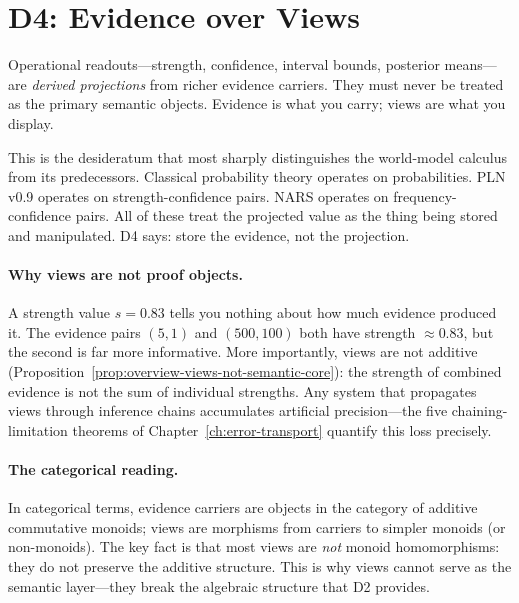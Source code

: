 \documentclass[11pt,openany]{report}
\begin{document}
\section{D4: Evidence over Views}
\label{sec:d4}

\begin{definition}
\label{def:d4}
Operational readouts---strength, confidence, interval bounds, posterior
means---are \emph{derived projections} from richer evidence carriers.
They must never be treated as the primary semantic objects.  Evidence
is what you carry; views are what you display.
\end{definition}

\noindent
This is the desideratum that most sharply distinguishes the world-model
calculus from its predecessors.  Classical probability theory operates
on probabilities.  PLN v0.9 operates on strength-confidence pairs.
NARS operates on frequency-confidence pairs.  All of these treat the
projected value as the thing being stored and manipulated.  D4 says:
store the evidence, not the projection.

\paragraph{Why views are not proof objects.}
A strength value $s = 0.83$ tells you nothing about how much evidence
produced it.  The evidence pairs $(5, 1)$ and $(500, 100)$ both have
strength $\approx 0.83$, but the second is far more informative.
More importantly, views are not additive
(Proposition~\ref{prop:overview-views-not-semantic-core}): the
strength of combined evidence is not the sum of individual strengths.
Any system that propagates views through inference chains accumulates
artificial precision---the five chaining-limitation theorems of
Chapter~\ref{ch:error-transport} quantify this loss precisely.

\paragraph{The categorical reading.}
In categorical terms, evidence carriers are objects in the category
of additive commutative monoids; views are morphisms from carriers to
simpler monoids (or non-monoids).  The key fact is that most views
are \emph{not} monoid homomorphisms: they do not preserve the
additive structure.  This is why views cannot serve as the semantic
layer---they break the algebraic structure that D2 provides.
\end{document}
